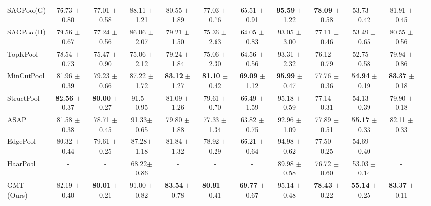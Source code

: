 \begin{table*}[t]
{\begin{tabular}{lccccccccccc}
SAGPool(G) & 76.73 $\pm$ 0.80 & 77.01 $\pm$ 0.58 & 88.11 $\pm$ 1.21 & 80.55 $\pm$ 1.89 & 77.03 $\pm$ 0.76 & 65.51 $\pm$ 0.91 & \textbf{95.59} $\pm$ 1.22 & \textbf{78.09} $\pm$ 0.58 & 53.73 $\pm$ 0.42 & 81.91 $\pm$ 0.45 \\
SAGPool(H) & 79.56 $\pm$ 0.67 & 77.24 $\pm$ 0.56 & 86.06 $\pm$ 2.07 & 79.21 $\pm$ 1.50 & 75.36 $\pm$ 2.63 & 64.05 $\pm$ 0.83 & 93.05 $\pm$ 3.00 & 77.11 $\pm$ 0.46 & 53.49 $\pm$ 0.65 & 80.55 $\pm$ 0.56 \\
TopKPool   & 78.54 $\pm$ 0.73 & 75.47 $\pm$ 0.90 & 75.06 $\pm$ 2.12 & 79.24 $\pm$ 1.84 & 75.06 $\pm$ 2.30 & 64.56 $\pm$ 0.56 & 93.31 $\pm$ 2.32 & 76.12 $\pm$ 0.79 & 52.75 $\pm$ 0.58 & 79.94 $\pm$ 0.86 \\
MinCutPool & 81.96 $\pm$ 0.39 & 79.23 $\pm$ 0.66 & 87.22 $\pm$ 1.72 & \textbf{83.12} $\pm$ 1.27 & \textbf{81.10} $\pm$ 0.42 & \textbf{69.09} $\pm$ 1.12 & \textbf{95.99} $\pm$ 0.47 & 77.76 $\pm$ 0.36 & \textbf{54.94} $\pm$ 0.19 & \textbf{83.37} $\pm$ 0.18 \\
StructPool & \textbf{82.56} $\pm$ 0.37 & \textbf{80.00} $\pm$ 0.27 & 91.5 $\pm$ 0.95 & 81.09 $\pm$ 1.26 & 79.61 $\pm$ 0.70 & 66.49 $\pm$ 1.59 & 95.18 $\pm$ 0.59 & 77.14 $\pm$ 0.31 & 54.13  $\pm$ 0.39 & 79.90 $\pm$ 0.18 \\
ASAP       & 81.58 $\pm$ 0.38 & 78.71 $\pm$ 0.45 & 91.33$\pm$ 0.65 &  79.80 $\pm$ 1.88  & 77.33 $\pm$ 1.34 & 63.82 $\pm$ 0.75 & 92.96 $\pm$ 1.09 & 77.89 $\pm$ 0.51 & \textbf{55.17}  $\pm$ 0.33 & 82.11 $\pm$ 0.33 \\
EdgePool   & 80.32 $\pm$ 0.44 & 79.61 $\pm$ 0.25 & 87.28$\pm$ 1.18 & 81.84 $\pm$ 1.32 & 78.92 $\pm$ 0.29 & 66.21 $\pm$ 0.64 & 94.98 $\pm$ 0.62 & 77.50 $\pm$ 0.25 & 54.69  $\pm$ 0.40 &         -        \\
HaarPool   &         -        & - & 68.22$\pm$ 0.86 &         -        &         -        &         -        & 89.98 $\pm$ 0.58 & 76.72 $\pm$ 0.60 & 53.03  $\pm$ 0.14 &         -        \\
\midrule
GMT (Ours) & 82.19 $\pm$ 0.40 & \textbf{80.01} $\pm$ 0.21 & 91.00 $\pm$ 0.82 & \textbf{83.54} $\pm$ 0.78 & \textbf{80.91} $\pm$ 0.41 & \textbf{69.77} $\pm$ 0.67 & 95.14 $\pm$ 0.48 & \textbf{78.43} $\pm$ 0.22 & \textbf{55.14} $\pm$ 0.25 & \textbf{83.37} $\pm$ 0.11 \\
\bottomrule
\end{tabular}
}
\vspace{-0.15in}
\label{app:table:results:chemical}
\end{table*} 
